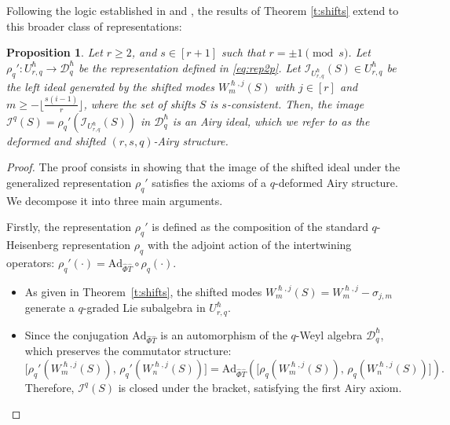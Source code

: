 \documentclass[reqno,11pt]{amsart}
\theoremstyle{plain}
\newtheorem{proposition}[theorem]{Proposition}
\theoremstyle{definition}
\theoremstyle{remark}
\numberwithin{equation}{section}
\newcommand{\1}{\mathds{1}}
\newcommand{\2}{\frac{1}{2}}
\begin{document}
{				Following the logic established in \cite{BBCCN18} and \cite{BKS23}, the results of Theorem \ref{t:shifts} extend to this broader class of representations:
				
				\begin{proposition}\label{p:shiftsgen}
					Let $ r \geq 2$, and $ s \in [r+1]$ such that $ r = \pm 1 \pmod{s}$. Let $\rho_q': U^\hslash_{r,q} \to \mathcal{D}_{q}^\hslash$ be the representation defined in \eqref{eq:rep2p}. Let $\mathcal{I}_{U_{r,q}^\hslash}(S) \in U^\hslash_{r,q}$ be the left ideal generated by the shifted modes $W^{\hslash,j}_m(S)$ with $j \in [r]$ and $m \geq - \lfloor \frac{s(i-1)}{r} \rfloor $, where the set of shifts $S$ is $s$-consistent.
					Then, the image  $\mathcal{I}^q(S)=\rho_q'(\mathcal{I}_{U^\hslash_{r,q}}(S))$ in $\mathcal{D}^\hslash_{q}$  is an Airy ideal, which we refer to as the deformed and shifted $(r,s,q)$-Airy structure.
				\end{proposition}
				\begin{proof}
					{The proof consists in showing that the image of the shifted ideal under the generalized representation $\rho_q'$ satisfies the axioms of a $q$-deformed Airy structure. We decompose it into three main arguments.}
					
					{Firstly, the representation $\rho_q'$ is defined as the composition of the standard $q$-Heisenberg representation $\rho_q$ with the adjoint action of the intertwining operators: $\rho_q'(\cdot) = \text{Ad}_{\hat{\Phi}\hat{T}} \circ \rho_q(\cdot)$.
						\begin{itemize}
							\item[(a)] As given in Theorem~\ref{t:shifts}, the shifted modes $W^{\hslash,j}_m(S) = W^{\hslash,j}_m - \sigma_{j,m}$ generate a $q$-graded Lie subalgebra in $U^\hslash_{r,q}$.
							\item[(b)] Since the conjugation $\text{Ad}_{\hat{\Phi}\hat{T}}$ is an automorphism of the $q$-Weyl algebra $\mathcal{D}_q^\hslash$, which preserves the commutator structure:
							\begin{equation}
								\big[\rho_q'(W^{\hslash,j}_m(S)),\, \rho_q'(W^{\hslash,j}_n(S))\big] = \text{Ad}_{\hat{\Phi}\hat{T}} \left( \big[\rho_q(W^{\hslash,j}_m(S)),\, \rho_q(W^{\hslash,j}_n(S))\big] \right).
							\end{equation}
							Therefore, $\mathcal{I}^q(S)$ is closed under the bracket, satisfying the first Airy axiom.
					\end{itemize}}
					

\end{proof}}
\end{document}
